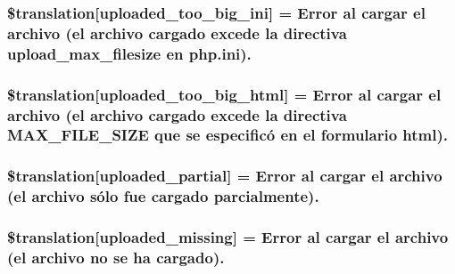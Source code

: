 \subsubsection[{\$translation}]{\setlength{\rightskip}{0pt plus 5cm}\$translation\mbox{[}\textquotesingle{}uploaded\+\_\+too\+\_\+big\+\_\+ini\textquotesingle{}\mbox{]} = \textquotesingle{}Error al cargar el archivo (el archivo cargado excede la directiva upload\+\_\+max\+\_\+filesize en php.\+ini).\textquotesingle{}}\label{class_8upload_8es___e_s_8php_a6a08dcd0d3651fdd098568f6b2f0a42c}
\hypertarget{class_8upload_8es___e_s_8php_a623d5b8b92169f57d7e43458aa911cbb}{}
\subsubsection[{\$translation}]{\setlength{\rightskip}{0pt plus 5cm}\$translation\mbox{[}\textquotesingle{}uploaded\+\_\+too\+\_\+big\+\_\+html\textquotesingle{}\mbox{]} = \textquotesingle{}Error al cargar el archivo (el archivo cargado excede la directiva M\+A\+X\+\_\+\+F\+I\+L\+E\+\_\+\+S\+I\+Z\+E que se especificó en el formulario html).\textquotesingle{}}\label{class_8upload_8es___e_s_8php_a623d5b8b92169f57d7e43458aa911cbb}
\hypertarget{class_8upload_8es___e_s_8php_a967c17da21b0a2d3bd65cca3a9ca0ea8}{}
\subsubsection[{\$translation}]{\setlength{\rightskip}{0pt plus 5cm}\$translation\mbox{[}\textquotesingle{}uploaded\+\_\+partial\textquotesingle{}\mbox{]} = \textquotesingle{}Error al cargar el archivo (el archivo sólo fue cargado parcialmente).\textquotesingle{}}\label{class_8upload_8es___e_s_8php_a967c17da21b0a2d3bd65cca3a9ca0ea8}
\hypertarget{class_8upload_8es___e_s_8php_a0cce433260be65f1f35853a6b4b8952b}{}
\subsubsection[{\$translation}]{\setlength{\rightskip}{0pt plus 5cm}\$translation\mbox{[}\textquotesingle{}uploaded\+\_\+missing\textquotesingle{}\mbox{]} = \textquotesingle{}Error al cargar el archivo (el archivo no se ha cargado).\textquotesingle{}}\label{class_8upload_8es___e_s_8php_a0cce433260be65f1f35853a6b4b8952b}
\hypertarget{class_8upload_8es___e_s_8php_a4a9168e922b827e6a28b5db1c00774ca}{}
